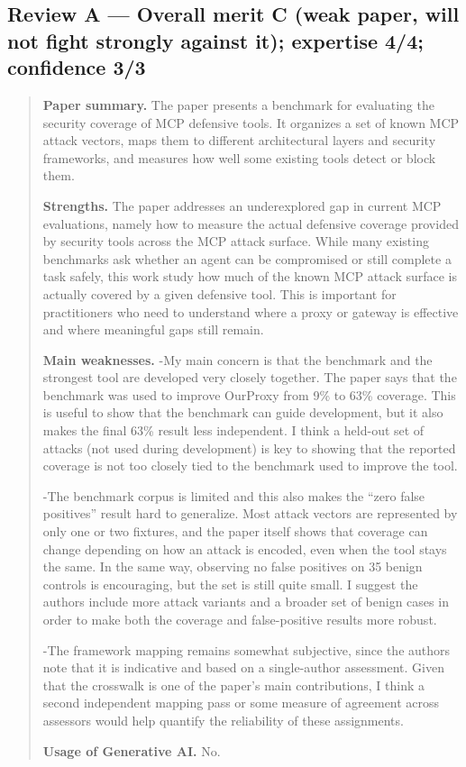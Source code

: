 \documentclass[conference]{IEEEtran}
\begin{document}
\subsection*{Review A --- Overall merit C (weak paper, will not fight strongly against it); expertise 4/4; confidence 3/3}
\begin{quote}\small
\textbf{Paper summary.} The paper presents a benchmark for evaluating the security coverage of MCP defensive tools. It organizes a set of known MCP attack vectors, maps them to different architectural layers and security frameworks, and measures how well some existing tools detect or block them.

\textbf{Strengths.} The paper addresses an underexplored gap in current MCP evaluations, namely how to measure the actual defensive coverage provided by security tools across the MCP attack surface. While many existing benchmarks ask whether an agent can be compromised or still complete a task safely, this work study how much of the known MCP attack surface is actually covered by a given defensive tool. This is important for practitioners who need to understand where a proxy or gateway is effective and where meaningful gaps still remain.

\textbf{Main weaknesses.}
-My main concern is that the benchmark and the strongest tool are developed very closely together. The paper says that the benchmark was used to improve OurProxy from 9\% to 63\% coverage. This is useful to show that the benchmark can guide development, but it also makes the final 63\% result less independent. I think a held-out set of attacks (not used during development) is key to showing that the reported coverage is not too closely tied to the benchmark used to improve the tool.

-The benchmark corpus is limited and this also makes the ``zero false positives'' result hard to generalize. Most attack vectors are represented by only one or two fixtures, and the paper itself shows that coverage can change depending on how an attack is encoded, even when the tool stays the same. In the same way, observing no false positives on 35 benign controls is encouraging, but the set is still quite small. I suggest the authors include more attack variants and a broader set of benign cases in order to make both the coverage and false-positive results more robust.

-The framework mapping remains somewhat subjective, since the authors note that it is indicative and based on a single-author assessment. Given that the crosswalk is one of the paper's main contributions, I think a second independent mapping pass or some measure of agreement across assessors would help quantify the reliability of these assignments.

\textbf{Usage of Generative AI.} No.
\end{quote}
\end{document}
